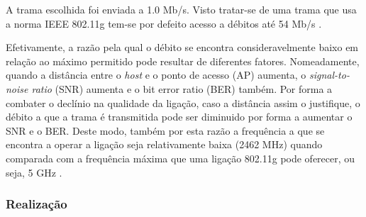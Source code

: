 \documentclass{llncs}
\begin{document}
A trama escolhida foi enviada a 1.0 Mb/s. Visto tratar-se de uma trama que usa a norma IEEE 802.11g tem-se por defeito acesso a débitos até 54 Mb/s \cite{computer_networking}.

Efetivamente, a razão pela qual o débito se encontra consideravelmente baixo em relação ao máximo permitido pode resultar de diferentes fatores. Nomeadamente, quando a distância entre o \textit{host} e o ponto de acesso (AP) aumenta, o \textit{signal-to-noise ratio} (SNR) aumenta e o bit error ratio (BER) também. Por forma a combater o declínio na qualidade da ligação, caso a distância assim o justifique, o débito a que a trama é transmitida pode ser diminuido por forma a aumentar o SNR e o BER. Deste modo, também por esta razão a frequência a que se encontra a operar a ligação seja relativamente baixa (2462 MHz) quando comparada com a frequência máxima que uma ligação 802.11g pode oferecer, ou seja, 5 GHz \cite{computer_networking} \cite{wiki:ber} \cite{wiki:snr}.

\subsubsection{Realização}\rule[-10pt]{0pt}{10pt}\\
\end{document}
